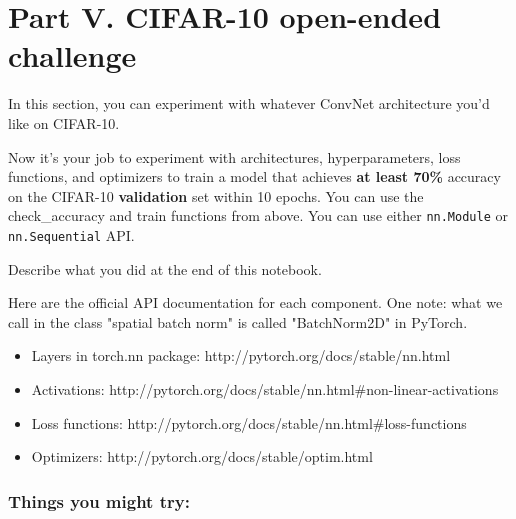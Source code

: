\documentclass[11pt]{article}
\providecommand{\tightlist}{%
      \setlength{\itemsep}{0pt}\setlength{\parskip}{0pt}}
\begin{document}
    \section{Part V. CIFAR-10 open-ended
challenge}\label{part-v.-cifar-10-open-ended-challenge}

In this section, you can experiment with whatever ConvNet architecture
you'd like on CIFAR-10.

Now it's your job to experiment with architectures, hyperparameters,
loss functions, and optimizers to train a model that achieves \textbf{at
least 70\%} accuracy on the CIFAR-10 \textbf{validation} set within 10
epochs. You can use the check\_accuracy and train functions from above.
You can use either \texttt{nn.Module} or \texttt{nn.Sequential} API.

Describe what you did at the end of this notebook.

Here are the official API documentation for each component. One note:
what we call in the class "spatial batch norm" is called "BatchNorm2D"
in PyTorch.

\begin{itemize}
\tightlist
\item
  Layers in torch.nn package: http://pytorch.org/docs/stable/nn.html
\item
  Activations:
  http://pytorch.org/docs/stable/nn.html\#non-linear-activations
\item
  Loss functions: http://pytorch.org/docs/stable/nn.html\#loss-functions
\item
  Optimizers: http://pytorch.org/docs/stable/optim.html
\end{itemize}

\subsubsection{Things you might try:}\label{things-you-might-try}
\end{document}
